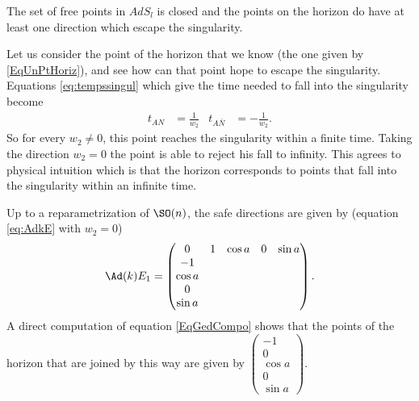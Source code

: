 \begin{corollary}		\label{CorTNFermeHorEchape}
The set of free points in $AdS_l$ is closed and the points on the horizon do have at least one direction which escape the singularity.
\end{corollary}

Let us consider the point of the horizon that we know (the one given by \eqref{EqUnPtHoriz}), and see how can that point hope to escape the singularity.  Equations \eqref{eq:tempssingul} which give the time needed to fall into the singularity become
\begin{align}
  t_{AN}&=\frac{1}{w_{2}}&t_{A \bar{N}}&=-\frac{1}{w_{2}}.
\end{align}
So for every $w_{2}\neq 0$, this point reaches the singularity within a finite time. Taking the direction $w_{2}=0$ the point is able to reject his fall to infinity. This agrees to physical intuition which is that the horizon corresponds to points that fall into the singularity within an infinite time.

Up to a reparametrization of $\SO(n)$, the safe directions are given by (equation \eqref{eq:AdkE} with $w_2=0$)
\[
   \Ad(k)E_1=
\begin{pmatrix}
0&1&\cos a&0&\sin a\\
-1\\
\cos a\\
0\\
\sin a
\end{pmatrix}.
\]
A direct  computation of equation \eqref{EqGedCompo}  shows that the points of the horizon that are joined by this way are given by
$
\begin{pmatrix}
-1\\
0\\
\cos a\\
0\\
\sin a
\end{pmatrix}.
$
